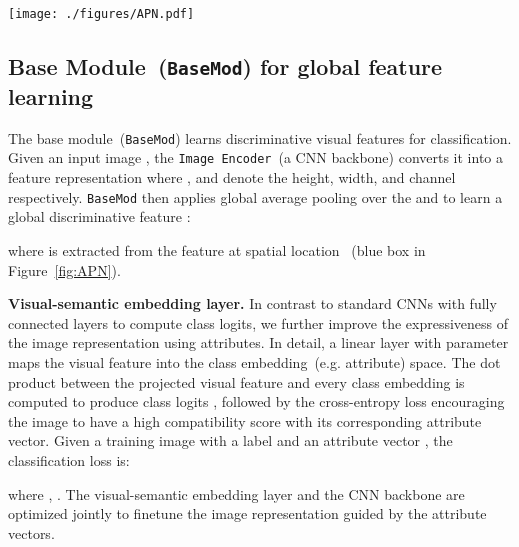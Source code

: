 \begin{figure*}[tb]
\label{APN}
  \centering
\texttt{[image: ./figures/APN.pdf]}
    \caption{
    }
  \label{fig:APN}
\end{figure*}



\subsection{Base Module~(\texttt{BaseMod}) for global feature learning}





The base module~(\texttt{BaseMod}) learns discriminative visual features for classification. Given an input image , the \texttt{Image Encoder}~(a CNN backbone) converts it into a feature representation  where ,  and  denote the height, width, and channel respectively.
\texttt{BaseMod} then applies global average pooling over the  and  to learn a global discriminative feature :
\begin{linenomath*}

\end{linenomath*}
where  is extracted from the  feature  at spatial location ~(blue box in Figure~\ref{fig:APN}).





\textbf{Visual-semantic embedding layer.} In contrast to standard CNNs with fully connected layers to compute class logits, we further improve the expressiveness of the image representation using attributes. In detail, a linear layer with parameter  maps the visual feature  into the class embedding~(e.g. attribute) space. 
The dot product between the projected visual feature and every class embedding is computed to produce class logits , followed by the cross-entropy loss encouraging the image to have a high compatibility score with its corresponding attribute vector.
Given a training image  with a label  and an attribute vector , the classification loss  is:
\begin{linenomath*}
    
\end{linenomath*}
where , .
The visual-semantic embedding layer and the CNN backbone are optimized jointly to finetune the image representation guided by the attribute vectors. 



